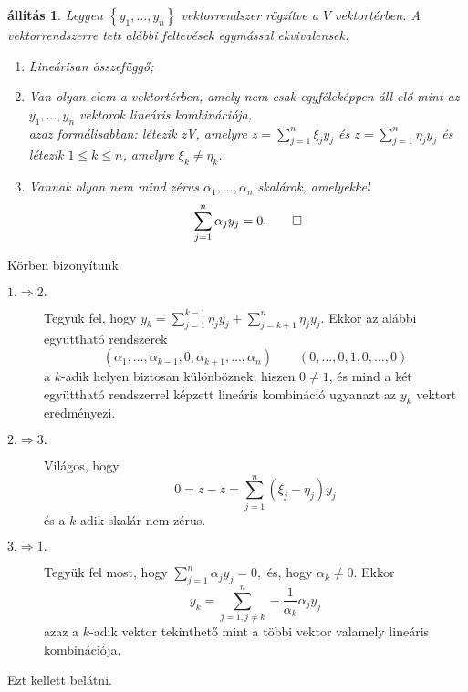 \documentclass[9pt, showtrims]{memoir}
\makeatletter
\renewenvironment{proof}[1][\proofname]
    {\par\pushQED{\qed}%
    \normalfont \topsep6\p@\@plus6\p@\relax
    \trivlist
    \item[\hskip\labelsep
        \itshape
    #1\@addpunct{:}]\ignorespaces}
    {\popQED\endtrivlist\@endpefalse}
\theoremstyle{plain}
\newtheorem{proposition}{állítás}[section]
\theoremstyle{remark}
\theoremstyle{definition}
\makeatother
\begin{document}
\begin{proposition}
    Legyen $\left\{ y_1,\dots,y_n \right\}$ vektorrendszer rögzítve a $V$ vektortérben.
    A vektorrendszerre tett alábbi feltevések egymással ekvivalensek.
    \begin{enumerate}
        \item Lineárisan összefüggő;
        \item Van olyan elem a vektortérben, amely nem csak egyféleképpen áll elő mint az $y_1,\dots,y_n$
            vektorok lineáris kombinációja,\\
            azaz formálisabban:
            létezik z\in V, amelyre $z=\sum_{j=1}^n\xi_jy_j$ és $z=\sum_{j=1}^n\eta_jy_j$
            és létezik $1\leq k\leq n$, amelyre $\xi_k\neq\eta_k$.
        \item Vannak olyan nem mind zérus $\alpha_1,\dots,\alpha_n$ skalárok, amelyekkel
            \[
                \sum_{j=1}^n\alpha_jy_j=0.\qedhere
            \]
    \end{enumerate}
\end{proposition}
\begin{proof}
    Körben bizonyítunk.
    \begin{description}
        \item[$1.\Rightarrow 2.$] 
            Tegyük fel, hogy $y_k=\sum_{j=1}^{k-1}\eta_jy_j+\sum_{j=k+1}^n\eta_jy_j$.
            Ekkor az alábbi együttható rendszerek
            \[
                \left( \alpha_1,\dots,\alpha_{k-1},0,\alpha_{k+1},\dots,\alpha_n \right)
                \qquad
                \left( 0,\dots,0,1,0,\dots,0 \right)
            \]
            a $k$-adik helyen biztosan különböznek, 
            hiszen $0\neq 1$, 
            és mind a két együttható rendszerrel képzett lineáris kombináció ugyanazt az $y_k$ vektort eredményezi.
        \item[$2.\Rightarrow 3.$]
            Világos, hogy 
            \[
                0=z-z=
                \sum_{j=1}^n\left( \xi_j-\eta_j \right)y_j
            \]
            és a $k$-adik skalár nem zérus.
        \item[$3.\Rightarrow 1.$]
            Tegyük fel most, hogy 
            \(
            \sum_{j=1}^n\alpha_jy_j=0,
            \)
            és, hogy $\alpha_k\neq 0.$
            Ekkor 
            \[
                y_k=\sum_{j=1,j\neq k}^n-\frac{1}{\alpha_k}\alpha_jy_j
            \]
            azaz a $k$-adik vektor tekinthető mint a többi vektor valamely lineáris kombinációja.
    \end{description}
    Ezt kellett belátni. 
\end{proof}
\end{document}
